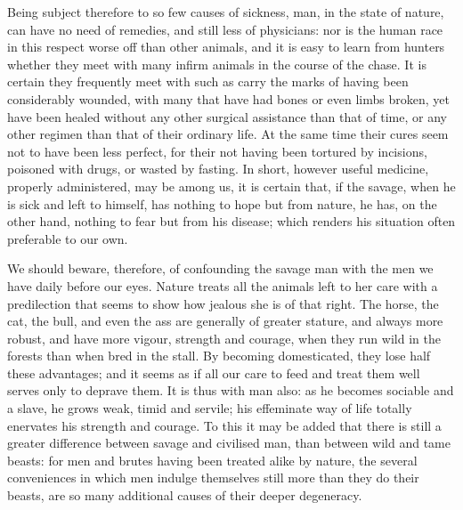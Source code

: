 \documentclass[12pt]{report}
\begin{document}
Being subject therefore to so few causes of sickness, man, in the state of nature, can have no need of remedies, and still less of physicians: nor is the human race in this respect worse off than other animals, and it is easy to learn from hunters whether they meet with many infirm animals in the course of the chase. It is certain they frequently meet with such as carry the marks of having been considerably wounded, with many that have had bones or even limbs broken, yet have been healed without any other surgical assistance than that of time, or any other regimen than that of their ordinary life. At the same time their cures seem not to have been less perfect, for their not having been tortured by incisions, poisoned with drugs, or wasted by fasting. In short, however useful medicine, properly administered, may be among us, it is certain that, if the savage, when he is sick and left to himself, has nothing to hope but from nature, he has, on the other hand, nothing to fear but from his disease; which renders his situation often preferable to our own.

We should beware, therefore, of confounding the savage man with the men we have daily before our eyes. Nature treats all the animals left to her care with a predilection that seems to show how jealous she is of that right. The horse, the cat, the bull, and even the ass are generally of greater stature, and always more robust, and have more vigour, strength and courage, when they run wild in the forests than when bred in the stall. By becoming domesticated, they lose half these advantages; and it seems as if all our care to feed and treat them well serves only to deprave them. It is thus with man also: as he becomes sociable and a slave, he grows weak, timid and servile; his effeminate way of life totally enervates his strength and courage. To this it may be added that there is still a greater difference between savage and civilised man, than between wild and tame beasts: for men and brutes having been treated alike by nature, the several conveniences in which men indulge themselves still more than they do their beasts, are so many additional causes of their deeper degeneracy.
\end{document}
